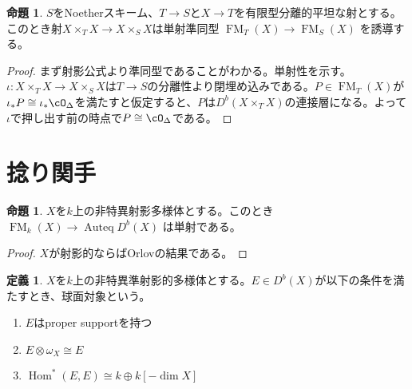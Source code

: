 \documentclass[uplatex, a4paper, dvipdfmx]{jsarticle}
\theoremstyle{definition}
\newtheorem{definition}[theorem]{定義}
\newtheorem{proposition}[theorem]{命題}
\DeclareMathOperator{\Hom}{\mathrm{Hom}}
\DeclareMathOperator{\Auteq}{\mathrm{Auteq}}
\DeclareMathOperator{\FM}{\mathrm{FM}}
\begin{document}
\begin{proposition}
    $S$をNoetherスキーム、$T \to S$と$X \to T$を有限型分離的平坦な射とする。このとき射$X \times_T X \to X \times_S X$は単射準同型
    $\FM_{T}(X) \to \FM_{S}(X)$
    を誘導する。
\end{proposition}
\begin{proof}
    まず射影公式より準同型であることがわかる。単射性を示す。
    $\iota \colon X \times_T X \to X \times_S X$は$T \to S$の分離性より閉埋め込みである。$P \in \FM_T (X)$が$\iota_*P \cong \iota_*\cO_\Delta$を満たすと仮定すると、$P$は$D^b(X \times_T X)$の連接層になる。よって$\iota$で押し出す前の時点で$P \cong \cO_\Delta$である。
\end{proof}
\section{捻り関手}
\begin{proposition}
    $X$を$k$上の非特異射影多様体とする。このとき$\FM_k(X) \to \Auteq D^b(X)$
    は単射である。
\end{proposition}
\begin{proof}
    $X$が射影的ならばOrlovの結果である。
\end{proof}
\begin{definition}
    $X$を$k$上の非特異準射影的多様体とする。$E \in D^b(X)$が以下の条件を満たすとき、球面対象という。
    \begin{enumerate}
        \item $E$はproper supportを持つ
        \item $E \otimes \omega_X \cong E$
        \item $\Hom^*(E, E) \cong k \oplus k[-\dim X]$
    \end{enumerate}
\end{definition}
\end{document}
